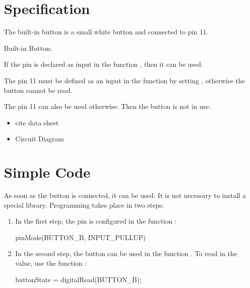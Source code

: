 \section{Specification}

The built-in button is a small white button  and connected to pin 11.

\begin{description}
    \item [Built-in Button:] 
\end{description}

If the pin is declared as input in the function , then it can be used.


The pin 11 must be defined as an input in the function  by setting , otherwise the button cannot be read.

\medskip 


The pin 11 can also be used otherwise. Then the button is not in use. \cite{Arduino:2023a,Arduino:2023,ArduinoNano33Manual:2022}


\Mynote
{
\begin{itemize}
  \item cite data sheet
  \item Circuit Diagram
\end{itemize}
}

\section{Simple Code}


As soon as the button is connected, it can be used. It is not necessary to install a special library. Programming takes place in two steps:

\begin{enumerate}
    \item In the first step, the pin is configured in the function :
    
    {
        \begin{Arduino}
            pinMode(BUTTON_B, INPUT_PULLUP)   
        \end{Arduino}
    }
    \item In the second step, the button can be used in the function . To read in the value, use the function :
    
    {
        \begin{Arduino}
            buttonState = digitalRead(BUTTON_B);
        \end{Arduino}
    }
    
\end{enumerate}




